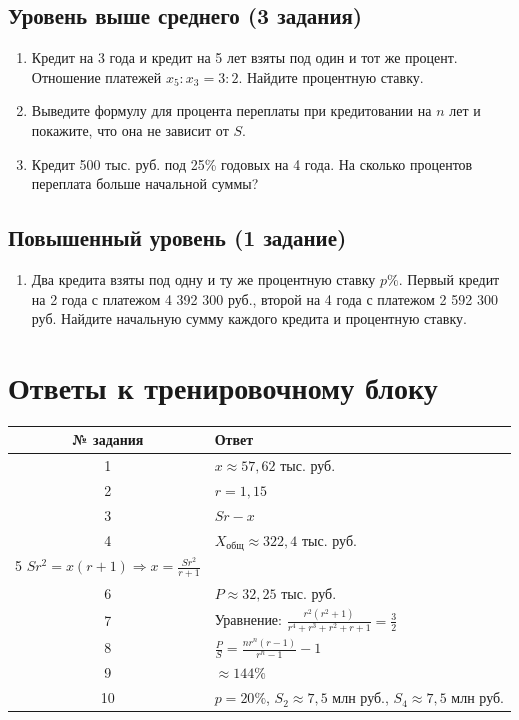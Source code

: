 \documentclass[a4paper,12pt]{article}
\begin{document}
\subsection*{Уровень выше среднего (3 задания)}
\begin{enumerate}[label=\arabic*., leftmargin=*, start=7]
    \item Кредит на 3 года и кредит на 5 лет взяты под один и тот же процент. Отношение платежей $x_5 : x_3 = 3 : 2$. Найдите процентную ставку.
    
    \item Выведите формулу для процента переплаты при кредитовании на $n$ лет и покажите, что она не зависит от $S$.
    
    \item Кредит 500 тыс. руб. под 25\% годовых на 4 года. На сколько процентов переплата больше начальной суммы?
\end{enumerate}

\subsection*{Повышенный уровень (1 задание)}
\begin{enumerate}[label=\arabic*., leftmargin=*, start=10]
    \item Два кредита взяты под одну и ту же процентную ставку $p\%$. Первый кредит на 2 года с платежом 4 392 300 руб., второй на 4 года с платежом 2 592 300 руб. Найдите начальную сумму каждого кредита и процентную ставку.
\end{enumerate}

\newpage

\section*{Ответы к тренировочному блоку}

\begin{center}
\renewcommand{\arraystretch}{1.5}
\begin{tabular}{cl}
\toprule
\textbf{№ задания} & \textbf{Ответ} \\
\midrule
1 & $x \approx 57{,}62$ тыс. руб. \\
2 & $r = 1{,}15$ \\
3 & $Sr - x$ \\
4 & $X_{общ} \approx 322{,}4$ тыс. руб. \\
5 $Sr^2 = x(r+1) \Rightarrow x = \frac{Sr^2}{r+1}$ \\
6 & $P \approx 32{,}25$ тыс. руб. \\
7 & Уравнение: $\frac{r^2(r^2+1)}{r^4+r^3+r^2+r+1} = \frac{3}{2}$ \\
8 & $\frac{P}{S} = \frac{nr^n(r-1)}{r^n-1} - 1$ \\
9 & $\approx 144\%$ \\
10 & $p = 20\%$, $S_2 \approx 7{,}5$ млн руб., $S_4 \approx 7{,}5$ млн руб. \\
\bottomrule
\end{tabular}
\end{center}
\end{document}

